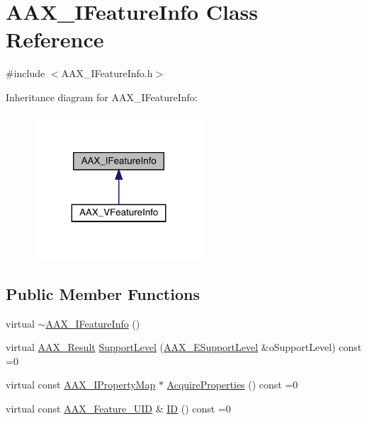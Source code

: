 \hypertarget{a01829}{}\section{A\+A\+X\+\_\+\+I\+Feature\+Info Class Reference}
\label{a01829}


{\ttfamily \#include $<$A\+A\+X\+\_\+\+I\+Feature\+Info.\+h$>$}



Inheritance diagram for A\+A\+X\+\_\+\+I\+Feature\+Info\+:
\nopagebreak
\begin{figure}[H]
\begin{center}
\leavevmode
\includegraphics[width=179pt]{a01828}
\end{center}
\end{figure}
\subsection*{Public Member Functions}
\begin{DoxyCompactItemize}
\item 
virtual \mbox{\hyperlink{a01829_a41bb5b2ba57b7883c9f96539fcd46fb3}{$\sim$\+A\+A\+X\+\_\+\+I\+Feature\+Info}} ()
\item 
virtual \mbox{\hyperlink{a00392_a4d8f69a697df7f70c3a8e9b8ee130d2f}{A\+A\+X\+\_\+\+Result}} \mbox{\hyperlink{a01829_a5f105b85ef855eb8c3da0ff06325b018}{Support\+Level}} (\mbox{\hyperlink{a00491_aca7bf42860665d5da66f4ac342e761b3}{A\+A\+X\+\_\+\+E\+Support\+Level}} \&o\+Support\+Level) const =0
\item 
virtual const \mbox{\hyperlink{a01869}{A\+A\+X\+\_\+\+I\+Property\+Map}} $\ast$ \mbox{\hyperlink{a01829_ab74a4576cd4e87baa01d046dfa0c752e}{Acquire\+Properties}} () const =0
\item 
virtual const \mbox{\hyperlink{a00392_a53d6cf8a08224b3e813333e411ce798e}{A\+A\+X\+\_\+\+Feature\+\_\+\+U\+ID}} \& \mbox{\hyperlink{a01829_aec2b87eadca9e5d55d7b93163b5ee1da}{ID}} () const =0
\end{DoxyCompactItemize}


